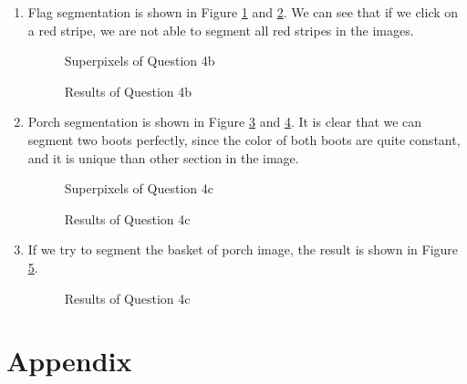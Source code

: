 \documentclass[12pt]{article}
\begin{document}
\begin{enumerate}
\begin{enumerate}
	\item Flag segmentation is shown in Figure \ref{fig:q4_2_1} and \ref{fig:q4_2_2}. We can see that if we click on a red stripe, we are not able to segment all red stripes in the images.
	\begin{figure}[H]
		\centering{}
		\caption{Superpixels of Question 4b}
		\label{fig:q4_2_1}
	\end{figure}
	\begin{figure}[H]
		\centering{}
		\caption{Results of Question 4b}
		\label{fig:q4_2_2}
	\end{figure}

	\item Porch segmentation is shown in Figure \ref{fig:q4_3_1} and \ref{fig:q4_3_2}. It is clear that we can segment two boots perfectly, since the color of both boots are quite constant, and it is unique than other section in the image.
	\begin{figure}[H]
		\centering{}
		\caption{Superpixels of Question 4c}
		\label{fig:q4_3_1}
	\end{figure}
	\begin{figure}[H]
		\centering{}
		\caption{Results of Question 4c}
		\label{fig:q4_3_2}
	\end{figure}

	\item If we try to segment the basket of porch image, the result is shown in Figure \ref{fig:q4_4}. 
	\begin{figure}[H]
		\centering{}
		\caption{Results of Question 4c}
		\label{fig:q4_4}
	\end{figure}
	
	
		
	\end{enumerate}
	\end{enumerate}
\pagebreak
\section*{Appendix}
\end{document}
